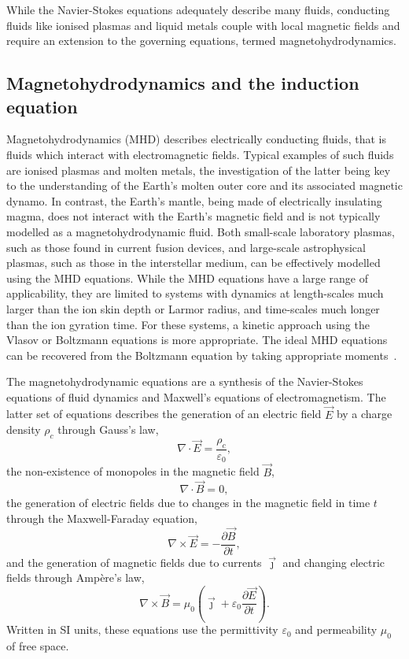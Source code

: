 While the Navier-Stokes equations adequately describe many fluids, conducting fluids like ionised plasmas and liquid metals couple with local magnetic fields and require an extension to the governing equations, termed magnetohydrodynamics.

\subsection{Magnetohydrodynamics and the induction equation}

Magnetohydrodynamics (MHD) describes electrically conducting fluids, that is fluids which interact with electromagnetic fields. Typical examples of such fluids are ionised plasmas and molten metals, the investigation of the latter being key to the understanding of the Earth's molten outer core and its associated magnetic dynamo. In contrast, the Earth's mantle, being made of electrically insulating magma, does not interact with the Earth's magnetic field and is not typically modelled as a magnetohydrodynamic fluid. Both small-scale laboratory plasmas, such as those found in current fusion devices, and large-scale astrophysical plasmas, such as those in the interstellar medium, can be effectively modelled using the MHD equations. While the MHD equations have a large range of applicability, they are limited to systems with dynamics at length-scales much larger than the ion skin depth or Larmor radius, and time-scales much longer than the ion gyration time. For these systems, a kinetic approach using the Vlasov or Boltzmann equations is more appropriate. The ideal MHD equations can be recovered from the Boltzmann equation by taking appropriate moments~\cite{boydPhysicsPlasmas2003}.

The magnetohydrodynamic equations are a synthesis of the Navier-Stokes equations of fluid dynamics and Maxwell's equations of electromagnetism. The latter set of equations describes the generation of an electric field $\vec{E}$ by a charge density $\rho_c$ through Gauss's law,
\begin{equation}
  \label{eq:gauss_law}
 \nabla \cdot \vec {E} ={\frac {\rho_c }{\varepsilon _{0}}},
\end{equation}
the non-existence of monopoles in the magnetic field $\vec{B}$,
\begin{equation}
  \label{eq:gauss_law_for_magnetism}
  \nabla \cdot \vec {B} =0,
\end{equation}
the generation of electric fields due to changes in the magnetic field in time $t$ through the Maxwell-Faraday equation,
\begin{equation}
  \label{eq:maxwell_faraday}
 \nabla \times \vec {E} =-{\frac {\partial \vec {B} }{\partial t}},
\end{equation}
and the generation of magnetic fields due to currents $\vec{\jmath}$ and changing electric fields through Ampère's law,
\begin{equation}
  \label{eq:ampere_law}
 \nabla \times \vec {B} =\mu _{0}\left(\vec {\jmath} +\varepsilon _{0}{\frac {\partial \vec {E} }{\partial t}}\right).
\end{equation}
Written in SI units, these equations use the permittivity $\varepsilon_{0}$ and permeability $\mu_0$ of free space.

